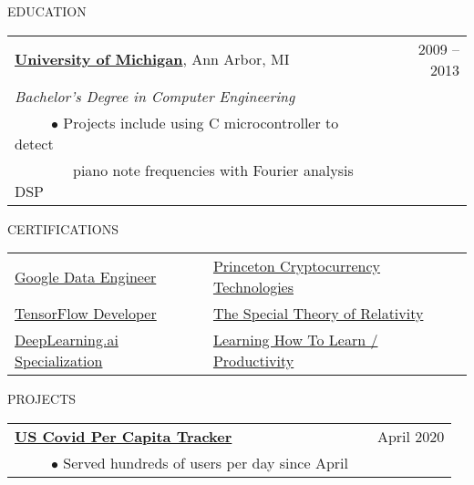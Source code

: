 \documentclass[11pt]{article}
\begin{document}
\vspace{.8cm}
\newpage
{EDUCATION}
\vspace{0.4cm}

\begin{tabularx}{\linewidth}{l X r}
\textbf{\href{https://ece.engin.umich.edu/academics/undergraduate-programs/programs/electrical-engineering}{University of Michigan}}, Ann Arbor, MI & &  2009 -- 2013 \\
\emph{Bachelor's Degree in Computer Engineering} \\
~~~~~$\bullet$ Projects include using C microcontroller to detect  \\
~~~~~~~~piano note frequencies with Fourier analysis DSP\\
\end{tabularx}

\vspace {0.8cm}


{CERTIFICATIONS}
\vspace {0.4cm}

\begin{tabularx}{\linewidth}{X X X}
  \href{https://www.credential.net/672098b8-2c29-4ed8-a4fe-aec082d55316}{Google Data Engineer}&
 
  \href{https://www.dropbox.com/s/h4mbfe9f79o2x32/proof.png?raw=1}{Princeton  Cryptocurrency Technologies} \\

  \href{https://coursera.org/share/1f7fbcab2199ace5323637ba261157c4}{TensorFlow Developer} &
 
  \href{https://www.coursera.org/account/accomplishments/certificate/9RBZ3CDBVBND}{The Special Theory of Relativity} \\
 
  \href{https://www.coursera.org/account/accomplishments/specialization/DYW5MPE86QH7}{DeepLearning.ai Specialization} &

  \href{https://www.coursera.org/account/accomplishments/certificate/PTADANB8K8UJ}{Learning How To Learn / Productivity} \\
\end{tabularx}


\vspace {.8cm}

{PROJECTS}
\vspace {0.4cm}

\begin{tabularx}{\linewidth}{l X r}
\textbf{\href{https://us-covid19-per-capita.net}{US Covid Per Capita Tracker}} & & April 2020  \\
~~~~~$\bullet$ Served hundreds of users per day since April\\
\end{tabularx}
\end{document}
